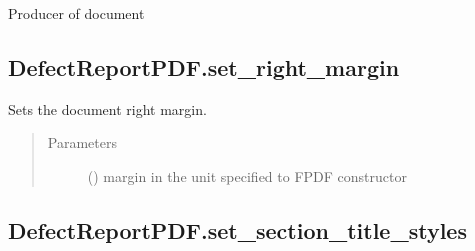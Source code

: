 \documentclass[letterpaper,10pt,english]{sphinxmanual}
\begin{document}
\begin{fulllineitems}
\begin{fulllineitems}
\label{\detokenize{generated/quality_assessment.quality_pdf_report.DefectReportPDF.set_producer:quality_assessment.quality_pdf_report.DefectReportPDF.set_producer}}
\sphinxAtStartPar
Producer of document

\end{fulllineitems}



\subsection{DefectReportPDF.set\_right\_margin}
\label{\detokenize{generated/quality_assessment.quality_pdf_report.DefectReportPDF.set_right_margin:defectreportpdf-set-right-margin}}\label{\detokenize{generated/quality_assessment.quality_pdf_report.DefectReportPDF.set_right_margin::doc}}

\begin{fulllineitems}
\label{\detokenize{generated/quality_assessment.quality_pdf_report.DefectReportPDF.set_right_margin:quality_assessment.quality_pdf_report.DefectReportPDF.set_right_margin}}
\sphinxAtStartPar
Sets the document right margin.
\begin{quote}\begin{description}
\item[{Parameters}] \leavevmode
\sphinxAtStartPar
{} () \textendash{} margin in the unit specified to FPDF constructor

\end{description}\end{quote}

\end{fulllineitems}



\subsection{DefectReportPDF.set\_section\_title\_styles}
\label{\detokenize{generated/quality_assessment.quality_pdf_report.DefectReportPDF.set_section_title_styles:defectreportpdf-set-section-title-styles}}\label{\detokenize{generated/quality_assessment.quality_pdf_report.DefectReportPDF.set_section_title_styles::doc}}


\end{fulllineitems}
\end{document}
